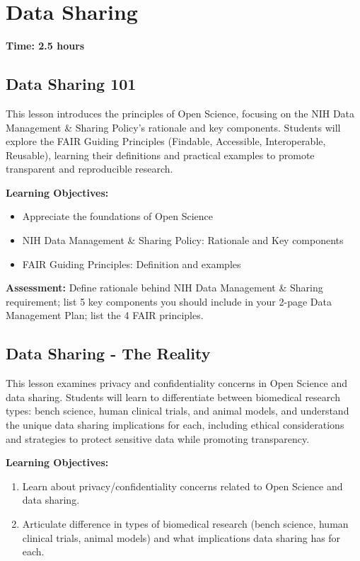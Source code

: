 \section{Data Sharing}
\label{sec:2.4}

\textbf{Time: 2.5 hours}

\subsection{Data Sharing 101}

This lesson introduces the principles of Open Science, focusing on the NIH Data Management \& Sharing Policy's rationale and key components. Students will explore the FAIR Guiding Principles (Findable, Accessible, Interoperable, Reusable), learning their definitions and practical examples to promote transparent and reproducible research.

\textbf{Learning Objectives:}
\begin{itemize}
    \item Appreciate the foundations of Open Science
    \item NIH Data Management \& Sharing Policy: Rationale and Key components
    \item FAIR Guiding Principles: Definition and examples
\end{itemize}

\textbf{Assessment:} Define rationale behind NIH Data Management \& Sharing requirement; list 5 key components you should include in your 2-page Data Management Plan; list the 4 FAIR principles.

\subsection{Data Sharing - The Reality}

This lesson examines privacy and confidentiality concerns in Open Science and data sharing. Students will learn to differentiate between biomedical research types: bench science, human clinical trials, and animal models, and understand the unique data sharing implications for each, including ethical considerations and strategies to protect sensitive data while promoting transparency.

\textbf{Learning Objectives:}
\begin{enumerate}
    \item Learn about privacy/confidentiality concerns related to Open Science and data sharing.
    \item Articulate difference in types of biomedical research (bench science, human clinical trials, animal models) and what implications data sharing has for each.
\end{enumerate}

